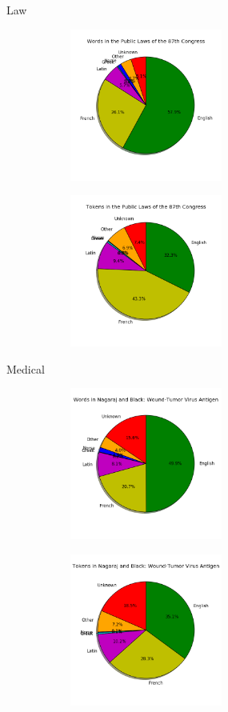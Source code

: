 \documentclass[10pt]{beamer}
\begin{document}
\begin{frame}[fragile]{Law}
  
  \begin{figure}
  \centering
  \begin{subfigure}
  \centering
    \includegraphics[width=5cm]{lawwords.png}
  \end{subfigure}
  \begin{subfigure}
  \centering
    \includegraphics[width=5cm]{lawtokens.png}
  \end{subfigure}
  \end{figure}  
\end{frame}


\begin{frame}[fragile]{Medical}
  
  \begin{figure}
  \centering
  \begin{subfigure}
  \centering
    \includegraphics[width=5cm]{medwords.png}
  \end{subfigure}
  \begin{subfigure}
  \centering
    \includegraphics[width=5cm]{medtokens.png}
  \end{subfigure}
  \end{figure}  
\end{frame}
\end{document}
